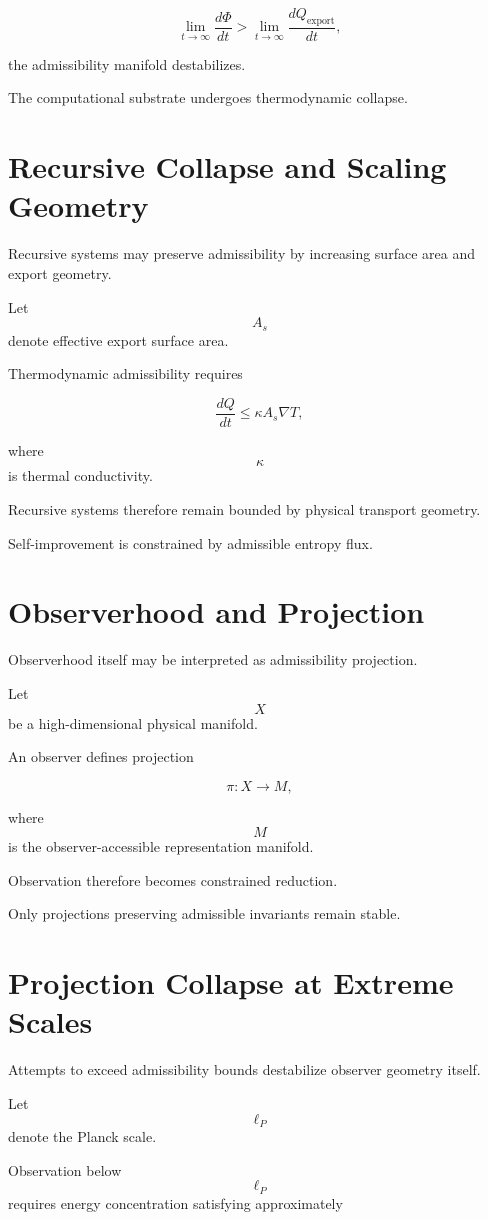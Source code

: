 \documentclass[12pt,openany]{book}
\theoremstyle{plain}
\theoremstyle{definition}
\theoremstyle{remark}
\begin{document}
\[
\lim_{t\to\infty}
\frac{d\Phi}{dt}
>
\lim_{t\to\infty}
\frac{dQ_{\mathrm{export}}}{dt},
\]

the admissibility manifold destabilizes.

The computational substrate undergoes thermodynamic collapse.

\section{Recursive Collapse and Scaling Geometry}

Recursive systems may preserve admissibility by increasing
surface area and export geometry.

Let
\[
A_s
\]
denote effective export surface area.

Thermodynamic admissibility requires

\[
\frac{dQ}{dt}
\leq
\kappa A_s \nabla T,
\]

where
\[
\kappa
\]
is thermal conductivity.

Recursive systems therefore remain bounded by physical transport
geometry.

Self-improvement is constrained by admissible entropy flux.

\section{Observerhood and Projection}

Observerhood itself may be interpreted as admissibility
projection.

Let
\[
X
\]
be a high-dimensional physical manifold.

An observer defines projection

\[
\pi :
X \to M,
\]

where
\[
M
\]
is the observer-accessible representation manifold.

Observation therefore becomes constrained reduction.

Only projections preserving admissible invariants remain stable.

\section{Projection Collapse at Extreme Scales}

Attempts to exceed admissibility bounds destabilize observer
geometry itself.

Let
\[
\ell_P
\]
denote the Planck scale.

Observation below
\[
\ell_P
\]
requires energy concentration satisfying approximately
\end{document}
